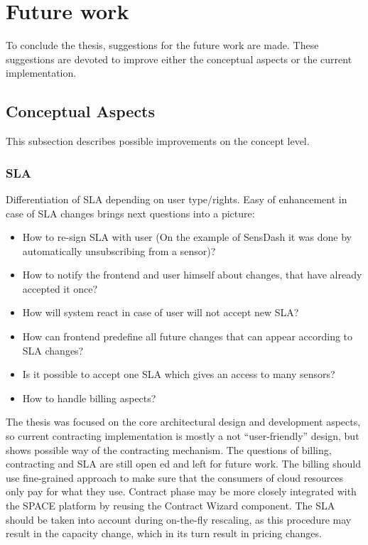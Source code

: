  \section{Future work}
	To conclude the thesis, suggestions for the future work are made. These suggestions are devoted to improve either the conceptual aspects or the current implementation.

\subsection{Conceptual Aspects}
	This subsection describes possible improvements on the concept level.
		\subsubsection {SLA}
		Differentiation of SLA depending on user type/rights. Easy of enhancement in case of SLA changes brings next questions into a picture: 
        \begin{itemize}
        \item How to re-sign SLA with user (On the example of SensDash it was done by automatically unsubscribing from a sensor)?
        \item How to notify the frontend and user himself about changes, that have already accepted it once?
        \item How will system react in case of user will not accept new SLA?
        \item How can frontend predefine all future changes that can appear according to SLA changes?
        \item Is it possible to accept one SLA which gives an access to many sensors?
        \item How to handle billing aspects?
        \end{itemize}

		The thesis was focused on the core architectural design and development aspects, so current contracting implementation is mostly a not ``user-friendly'' design, but shows possible way of the contracting mechanism. The questions of billing, contracting and SLA are still open ed and left for future work. The billing should use fine-grained approach to make sure that the consumers of cloud resources only pay for what they use. Contract phase may be more closely integrated with the SPACE platform by reusing the Contract Wizard component. The SLA should be taken into account during on-the-fly rescaling, as this procedure may result in the capacity change, which in its turn result in pricing changes. 

